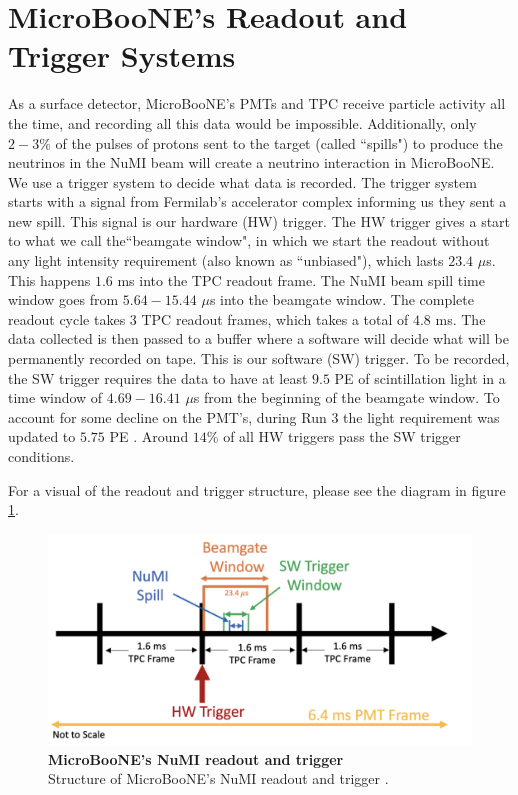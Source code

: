 \section{MicroBooNE's Readout and Trigger Systems}

As a surface detector, MicroBooNE's PMTs and TPC receive particle activity all the time, and recording all this data would be impossible. Additionally, only $2-3\%$ of the pulses of protons sent to the target (called ``spills") to produce the neutrinos in the NuMI beam will create a neutrino interaction in MicroBooNE. We use a trigger system to decide what data is recorded.
The trigger system starts with a signal from Fermilab's accelerator complex informing us they sent a new spill. This signal is our hardware (HW) trigger. The HW trigger gives a start to what we call the``beamgate window", in which we start the readout without any light intensity requirement (also known as ``unbiased"), which lasts $23.4$ $\mu $s. This happens $1.6$ ms into the TPC readout frame. The NuMI beam spill time window goes from $5.64- 15.44$ $\mu$s into the beamgate window. The complete readout cycle takes 3 TPC readout frames, which takes a total of $4.8$ ms.
The data collected is then passed to a buffer where a software will decide what will be permanently recorded on tape. This is our software (SW) trigger. To be recorded, the SW trigger requires the data to have at least $9.5$ PE of scintillation light in a time window of $4.69- 16.41$ $\mu$s from the beginning of the beamgate window. To account for some decline on the PMT's, during Run 3 the light requirement was updated to $5.75$ PE \cite{numi_redmine}. 
Around $14\%$ of all HW triggers pass the SW trigger conditions. 

For a visual of the readout and trigger structure, please see the diagram in figure \ref{trig}.

\begin{figure}[h!]
    \centering
    \includegraphics[width=150mm]{Figures/numi_trigger.jpg}
    \caption[MicroBooNE's NuMI readout and trigger]{\textbf{MicroBooNE's NuMI readout and trigger}\\Structure of MicroBooNE's NuMI readout and trigger \cite{krish_phd}.}
    \label{trig}
\end{figure}

